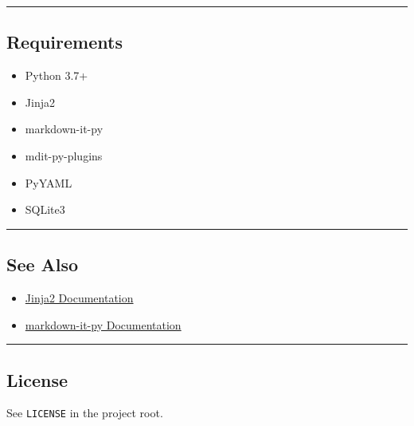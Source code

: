 \begin{center}\rule{0.5\linewidth}{0.5pt}\end{center}

\subsection{Requirements}\label{requirements}

\begin{itemize}
\tightlist
\item
  Python 3.7+
\item
  Jinja2
\item
  markdown-it-py
\item
  mdit-py-plugins
\item
  PyYAML
\item
  SQLite3
\end{itemize}

\begin{center}\rule{0.5\linewidth}{0.5pt}\end{center}

\subsection{See Also}\label{see-also}

\begin{itemize}
\tightlist
\item
  \href{https://jinja.palletsprojects.com/}{Jinja2 Documentation}
\item
  \href{https://markdown-it-py.readthedocs.io/}{markdown-it-py
  Documentation}
\end{itemize}

\begin{center}\rule{0.5\linewidth}{0.5pt}\end{center}

\subsection{License}\label{license}

See \texttt{LICENSE} in the project root.
